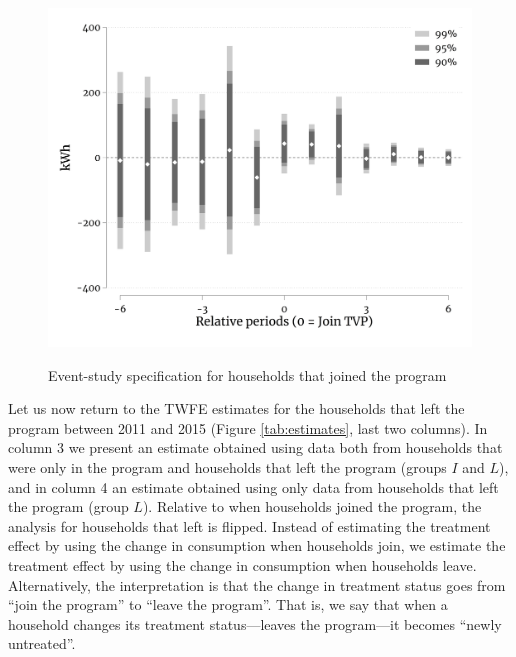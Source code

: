 \documentclass[12pt]{article}
\begin{document}
\begin{figure}[ht]
  \caption{Event-study specification for households that joined the program}\label{fig:two}
  \begin{center}
  {\includegraphics[width=1\textwidth]{./figures/eventStudyType1-2_6months.png}}
  \end{center}
\end{figure}

Let us now return to the TWFE estimates for the households that left the program between 2011 and 2015 (Figure \ref{tab:estimates}, last two columns). In column 3 we present an estimate obtained using data both from households that were only in the program and households that left the program (groups $I$ and  $L$), and in column 4 an estimate obtained using only data from households that left the program (group $L$). Relative to when households joined the program, the analysis for households that left is flipped. Instead of estimating the treatment effect by using the change in consumption when households join, we estimate the treatment effect by using the change in consumption when households leave. Alternatively, the interpretation is that the change in treatment status goes from \enquote{join the program} to \enquote{leave the program}. That is, we say that when a household changes its treatment status---leaves the program---it becomes \enquote{newly untreated}.
\end{document}
